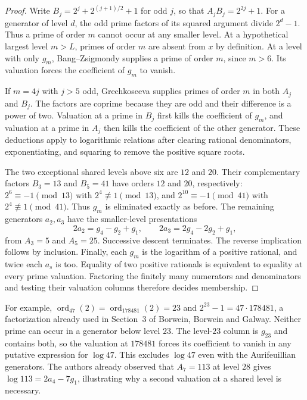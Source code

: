 \documentclass[11pt]{article}
\begin{document}
\begin{proof}
Write $B_j=2^j+2^{(j+1)/2}+1$ for odd $j$, so that $A_jB_j=2^{2j}+1$. For a generator of level $d$, the odd prime factors of its squared argument divide $2^d-1$. Thus a prime of order $m$ cannot occur at any smaller level. At a hypothetical largest level $m>L$, primes of order $m$ are absent from $x$ by definition. At a level with only $g_m$, Bang--Zsigmondy supplies a prime of order $m$, since $m>6$. Its valuation forces the coefficient of $g_m$ to vanish.

If $m=4j$ with $j>5$ odd, Grechkoseeva supplies primes of order $m$ in both $A_j$ and $B_j$. The factors are coprime because they are odd and their difference is a power of two. Valuation at a prime in $B_j$ first kills the coefficient of $g_m$, and valuation at a prime in $A_j$ then kills the coefficient of the other generator. These deductions apply to logarithmic relations after clearing rational denominators, exponentiating, and squaring to remove the positive square roots.

The two exceptional shared levels above six are $12$ and $20$. Their complementary factors $B_3=13$ and $B_5=41$ have orders $12$ and $20$, respectively: $2^6\equiv-1\pmod{13}$ with $2^4\not\equiv1\pmod{13}$, and $2^{10}\equiv-1\pmod{41}$ with $2^4\not\equiv1\pmod{41}$. Thus $g_m$ is eliminated exactly as before. The remaining generators $a_2,a_3$ have the smaller-level presentations
\[
 2a_2=g_4-g_2+g_1,\qquad
 2a_3=2g_4-2g_2+g_1,
\]
from $A_3=5$ and $A_5=25$. Successive descent terminates. The reverse implication follows by inclusion. Finally, each $g_m$ is the logarithm of a positive rational, and twice each $a_s$ is too. Equality of two positive rationals is equivalent to equality at every prime valuation. Factoring the finitely many numerators and denominators and testing their valuation columns therefore decides membership.
\end{proof}

For example, $\operatorname{ord}_{47}(2)=\operatorname{ord}_{178481}(2)=23$ and $2^{23}-1=47\cdot178481$, a factorization already used in Section~3 of Borwein, Borwein and Galway. Neither prime can occur in a generator below level $23$. The level-$23$ column is $g_{23}$ and contains both, so the valuation at $178481$ forces its coefficient to vanish in any putative expression for $\log47$. This excludes $\log47$ even with the Aurifeuillian generators. The authors already observed that $A_7=113$ at level $28$ gives $\log113=2a_4-7g_1$, illustrating why a second valuation at a shared level is necessary.
\end{document}
